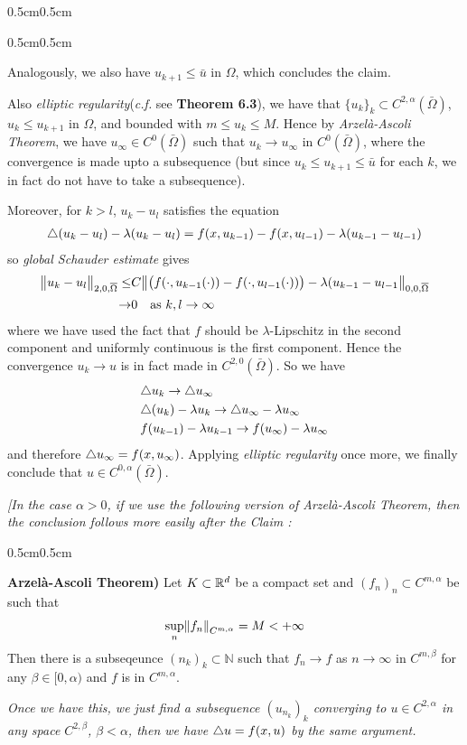 \documentclass[12pt,a4paper]{article}
\newenvironment{proof}
{\begin{changemargin}{0.5cm}{0.5cm} 
	}%
	{\end{changemargin}
}
\newenvironment{subproof}
{\begin{changemargin}{0.5cm}{0.5cm} 
	}%
	{\end{changemargin}
}
\newenvironment{p}
{\begin{proof} 
	}%
	{\end{proof}
}
\begin{document}
\begin{p}
\begin{subproof}
\quad Analogously, we also have $u_{k+1} \leq \bar{u}$ in $\Omega$, which concludes the claim.
\end{subproof}

Also \emph{elliptic regularity}(\textit{c.f.} see \textbf{Theorem 6.3}), we have that $\{u_k\}_k \subset C^{2, \alpha}(\bar{\Omega})$, $u_k \leq u_{k+1}$ in $\Omega$, and bounded with $m\leq u_k \leq M$. Hence by \emph{Arzel\`a-Ascoli Theorem}, we have $u_{\infty} \in C^{0}(\bar{\Omega})$ such that $u_k \rightarrow u_{\infty}$ in $C^0(\bar{\Omega})$, where the convergence is made upto a subsequence (but since $u_k \leq u_{k+1} \leq \bar{u}$ for each $k$, we in fact do not have to take a subsequence).

\quad Moreover, for $k>l$, $u_k -u_l$ satisfies the equation
\begin{align*}
\triangle (u_k - u_l) - \lambda(u_k -u_l) = f(x, u_{k-1}) - f(x, u_{l-1}) - \lambda(u_{k-1}- u_{l-1})
\end{align*}
so \emph{global Schauder estimate} gives
\begin{align*}
\bigl\lVert u_k - u_l\bigr\rVert_{2, 0, \overline{\Omega}} \leq & C \bigl\lVert \big( f(\cdot, u_{k-1}(\cdot)) - f(\cdot, u_{l-1}(\cdot)) \big) - \lambda (u_{k-1} - u_{l-1}\bigr\rVert_{0, 0, \overline{\Omega}} \\
\rightarrow & 0 \quad \text{as } k,l\rightarrow \infty
\end{align*}
where we have used the fact that $f$ should be $\lambda$-Lipschitz in the second component and uniformly continuous is the first component. Hence the convergence $u_k \rightarrow u$ is in fact made in $C^{2,0}(\bar{\Omega})$. So we have
\begin{align*}
& \triangle u_{k} \rightarrow \triangle u_{\infty}\\
& \triangle(u_{k}) - \lambda u_{k} \rightarrow \triangle u_{\infty} - \lambda u_{\infty} \\
& f(u_{k-1}) - \lambda u_{k-1} \rightarrow f(u_{\infty}) - \lambda u_{\infty}
\end{align*}
and therefore $\triangle u_{\infty} = f(x, u_{\infty})$. Applying \emph{elliptic regularity} once more, we finally conclude that $u\in C^{0, \alpha}(\bar{\Omega})$.
\s

\emph{[In the case $\alpha>0$, if we use the following version of Arzel\`a-Ascoli Theorem, then the conclusion follows more easily after the Claim :}
\begin{subproof}
\textbf{Arzel\`a-Ascoli Theorem)} Let $K \subset \mathbb{R}^d$ be a compact set and $(f_n)_n \subset C^{m, \alpha}$ be such that
\begin{align*}
\sup_{n} \snorms{f_n}{C^{m, \alpha}} = M < +\infty
\end{align*} 
Then there is a subseqeunce $(n_k)_k \subset \mathbb{N}$ such that $f_n \rightarrow f$ as $n\rightarrow \infty$ in $C^{m, \beta}$ for any $\beta \in [0, \alpha)$ and $f$ is in $C^{m, \alpha}$.
\end{subproof}
\emph{Once we have this, we just find a subsequence $(u_{n_k})_k$ converging to $u \in C^{2, \alpha}$ in any space $C^{2, \beta}$, $\beta < \alpha$, then we have $\triangle u = f(x, u)$ by the same argument.}
\s


\end{p}
\end{document}
